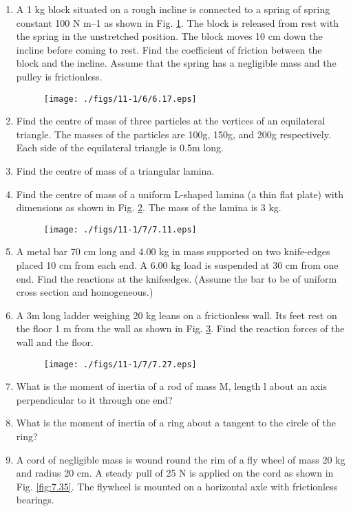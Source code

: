 \begin{enumerate}[label=\thesection.\arabic*.,ref=\thesection.\theenumi]
\item  A 1 kg block situated on a rough incline is connected to a spring of spring constant 100 N m–1
as shown in Fig. \ref{fig:6.17}. The block is released from rest with the spring in the
unstretched position. The block moves 10 cm down the incline before coming to rest. Find the coefficient of friction between the block and the incline. Assume that the
spring has a negligible mass and the pulley is frictionless.
\begin{figure}[!ht]
\texttt{[image: ./figs/11-1/6/6.17.eps]}
\caption{}
\label{fig:6.17}
\end{figure}
\item Find the centre of mass of three particles at the vertices of an equilateral triangle. The masses of the particles are 100g, 150g, and 200g respectively. Each side of the equilateral triangle is 0.5m long.
\item Find the centre of mass of a triangular lamina.
\item Find the centre of mass of a uniform L-shaped lamina (a thin flat plate) with dimensions as shown in Fig. \ref{fig:7.11}. The mass of the lamina is 3 kg.
\begin{figure}[!ht]
\texttt{[image: ./figs/11-1/7/7.11.eps]}
\caption{}
\label{fig:7.11}
\end{figure}
\item A metal bar 70 cm long and 4.00 kg in mass supported on two knife-edges placed 10 cm from each end. A 6.00 kg load is suspended at 30 cm from one end. Find the reactions at the knifeedges. (Assume the bar to be of uniform cross section and homogeneous.)
\item A 3m long ladder weighing 20 kg leans on a frictionless wall. Its feet rest on the floor 1 m from the wall as shown in Fig. \ref{fig:7.27}. Find the reaction forces of the wall and the floor.
\begin{figure}[!ht]
\texttt{[image: ./figs/11-1/7/7.27.eps]}
\caption{}
\label{fig:7.27}
\end{figure}
\item What is the moment of inertia of a rod of mass M, length l about an axis perpendicular to it through one end?
\item What is the moment of inertia of a ring about a tangent to the circle of the ring?
\item  A cord of negligible mass is wound round the rim of a fly wheel of mass 20 kg and radius 20 cm. A steady pull of 25 N is applied on the cord as shown in Fig. \ref{fig:7.35}. The flywheel is mounted on a horizontal axle with frictionless bearings.

\end{enumerate}
